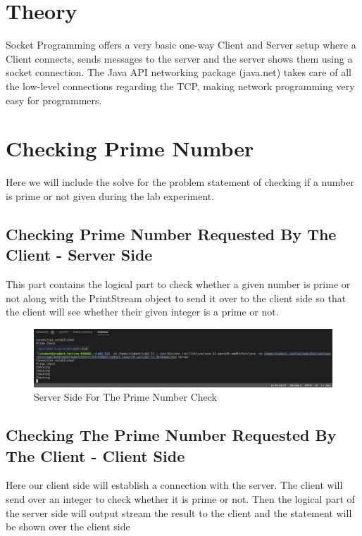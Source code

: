 \documentclass[11pt]{article}
\begin{document}
\section{Theory}
Socket Programming offers a very basic one-way Client and Server setup where a Client connects, sends messages to the server and the server shows them using a socket connection. The Java API networking package (java.net) takes care of all the low-level connections regarding the TCP, making network programming very easy for programmers.




\section{Checking Prime Number}
Here we will include the solve for the problem statement of checking if a number is prime or not given during the lab experiment.
\newpage
\subsection{Checking Prime Number Requested By The Client - Server Side }
This part contains the logical part to check whether a given number is prime or not along with the PrintStream object to send it over to the client side so that the client will see whether their given integer is a prime or not.


\begin{figure}[!h]
\centering
\includegraphics[width=\textwidth]{prime_server.png}
\caption{Server Side For The Prime Number Check}
\end{figure}
\newpage

\subsection{Checking The Prime Number Requested By The Client - Client Side}
Here our client side will establish a connection with the server. The client will send over an integer to check whether it is prime or not.  Then the logical part of the server side will output stream the result to the client and the statement will be shown over the client side
\end{document}
